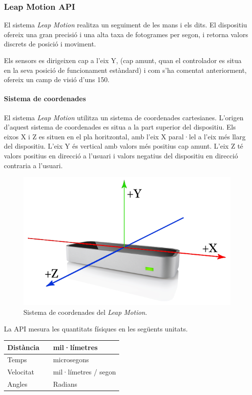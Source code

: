 \documentclass[12pt,a4paper,catalan]{article}
\begin{document}
	\subsubsection{Leap Motion API}
	El sistema \textit{Leap Motion} realitza un seguiment de les mans i els dits. El dispositiu ofereix una gran precisió i una alta taxa de fotogrames per segon, i retorna valors discrets de posició i moviment.
	
	Els sensors es dirigeixen cap a l'eix Y, (cap amunt, quan el controlador es situa en la seva posició de funcionament estàndard) i com s'ha comentat anteriorment, ofereix un camp de visió d'uns 150\textdegree.
	\paragraph{Sistema de coordenades}
	El sistema \textit{Leap Motion} utilitza un sistema de coordenades cartesianes. L'origen d'aquest sistema de coordenades es situa a la part superior del dispositiu. Els eixos X i Z es situen en el pla horitzontal, amb l'eix X paral·lel a l'eix més llarg del dispositiu. L'eix Y és vertical amb valors més positius cap amunt. L'eix Z té valors positius en direcció a l'usuari i valors negatius del dispositiu en direcció contraria a l'usuari.
	\begin{figure}[H]
		\includegraphics[width=\textwidth,keepaspectratio]{leap-coordinates.png}
		\centering
		\caption{Sistema de coordenades del \textit{Leap Motion}.}
		\label{fig:leap-coordinates}
	\end{figure}
	La API mesura les quantitats físiques en les següents unitats.\\
	
	\begin{tabular}{ l c l }
		\hline
		Distància & & mil·límetres\\ \hline
		Temps & & microsegons\\ \hline
		Velocitat & &  mil·límetres / segon\\ \hline
		Angles & & Radians\\
	\end{tabular}
	
\end{document}

